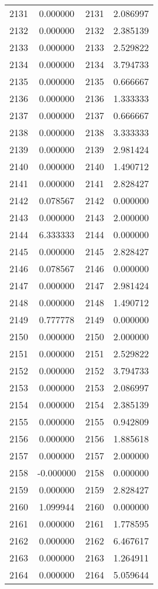 \documentclass[12pt]{article}
\begin{document}
\begin{longtable}{@{}cccc@{}}
2131 & 0.000000 & 2131 & 2.086997 \\
2132 & 0.000000 & 2132 & 2.385139 \\
2133 & 0.000000 & 2133 & 2.529822 \\
2134 & 0.000000 & 2134 & 3.794733 \\
2135 & 0.000000 & 2135 & 0.666667 \\
2136 & 0.000000 & 2136 & 1.333333 \\
2137 & 0.000000 & 2137 & 0.666667 \\
2138 & 0.000000 & 2138 & 3.333333 \\
2139 & 0.000000 & 2139 & 2.981424 \\
2140 & 0.000000 & 2140 & 1.490712 \\
2141 & 0.000000 & 2141 & 2.828427 \\
2142 & 0.078567 & 2142 & 0.000000 \\
2143 & 0.000000 & 2143 & 2.000000 \\
2144 & 6.333333 & 2144 & 0.000000 \\
2145 & 0.000000 & 2145 & 2.828427 \\
2146 & 0.078567 & 2146 & 0.000000 \\
2147 & 0.000000 & 2147 & 2.981424 \\
2148 & 0.000000 & 2148 & 1.490712 \\
2149 & 0.777778 & 2149 & 0.000000 \\
2150 & 0.000000 & 2150 & 2.000000 \\
2151 & 0.000000 & 2151 & 2.529822 \\
2152 & 0.000000 & 2152 & 3.794733 \\
2153 & 0.000000 & 2153 & 2.086997 \\
2154 & 0.000000 & 2154 & 2.385139 \\
2155 & 0.000000 & 2155 & 0.942809 \\
2156 & 0.000000 & 2156 & 1.885618 \\
2157 & 0.000000 & 2157 & 2.000000 \\
2158 & -0.000000 & 2158 & 0.000000 \\
2159 & 0.000000 & 2159 & 2.828427 \\
2160 & 1.099944 & 2160 & 0.000000 \\
2161 & 0.000000 & 2161 & 1.778595 \\
2162 & 0.000000 & 2162 & 6.467617 \\
2163 & 0.000000 & 2163 & 1.264911 \\
2164 & 0.000000 & 2164 & 5.059644 \\

\end{longtable}
\end{document}
